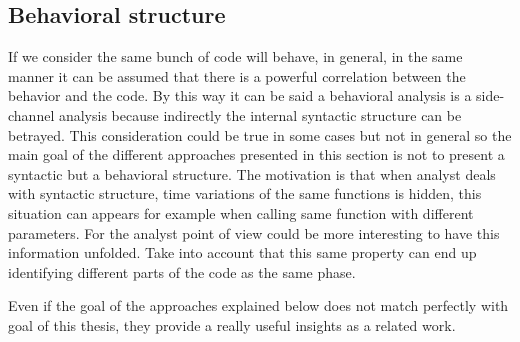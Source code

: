 \subsection{Behavioral structure}

If we consider the same bunch of code will behave, in general, in the same
manner it can be assumed that there is a powerful correlation between the
behavior and the code. By this way it can be said a behavioral analysis is a
side-channel analysis because indirectly the internal syntactic structure can be
betrayed. This consideration could be true in some cases but not in general so the 
main goal of the different approaches presented in this section is not
to present a syntactic but a behavioral structure. The motivation is that when
analyst deals with syntactic structure, time variations of the same functions is
hidden, this situation can appears for example when calling same function with
different parameters. For the analyst point of view could be more interesting to
have this information unfolded. Take into account that this same property can
end up identifying different parts of the code as the same phase.

Even if the goal of the approaches explained below does not match perfectly with
goal of this thesis, they provide a really useful insights as a related work.

